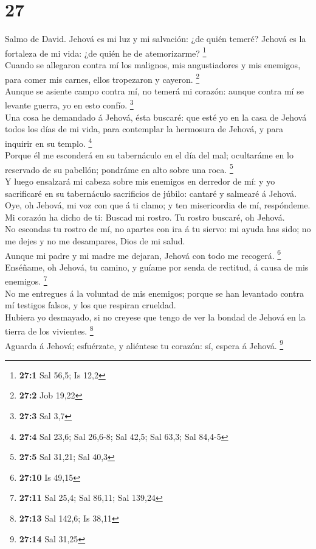 \hypertarget{section-26}{%
\section{27}\label{section-26}}

 Salmo de David. Jehová es mi luz y mi salvación: ¿de quién
temeré? Jehová es la fortaleza de mi vida: ¿de quién he de atemorizarme?
\footnote{\textbf{27:1} Sal 56,5; Is 12,2}\\
 Cuando se allegaron contra mí los malignos, mis
angustiadores y mis enemigos, para comer mis carnes, ellos tropezaron y
cayeron. \footnote{\textbf{27:2} Job 19,22}\\
 Aunque se asiente campo contra mí, no temerá mi corazón:
aunque contra mí se levante guerra, yo en esto confío. \footnote{\textbf{27:3}
  Sal 3,7}\\
 Una cosa he demandado á Jehová, ésta buscaré: que esté yo
en la casa de Jehová todos los días de mi vida, para contemplar la
hermosura de Jehová, y para inquirir en su templo. \footnote{\textbf{27:4}
  Sal 23,6; Sal 26,6-8; Sal 42,5; Sal 63,3; Sal 84,4-5}\\
 Porque él me esconderá en su tabernáculo en el día del mal;
ocultaráme en lo reservado de su pabellón; pondráme en alto sobre una
roca. \footnote{\textbf{27:5} Sal 31,21; Sal 40,3}\\
 Y luego ensalzará mi cabeza sobre mis enemigos en derredor
de mí: y yo sacrificaré en su tabernáculo sacrificios de júbilo: cantaré
y salmearé á Jehová.\\
 Oye, oh Jehová, mi voz con que á ti clamo; y ten
misericordia de mí, respóndeme.\\
 Mi corazón ha dicho de ti: Buscad mi rostro. Tu rostro
buscaré, oh Jehová.\\
 No escondas tu rostro de mí, no apartes con ira á tu
siervo: mi ayuda has sido; no me dejes y no me desampares, Dios de mi
salud.\\
 Aunque mi padre y mi madre me dejaran, Jehová con todo me
recogerá. \footnote{\textbf{27:10} Is 49,15}\\
 Enséñame, oh Jehová, tu camino, y guíame por senda de
rectitud, á causa de mis enemigos. \footnote{\textbf{27:11} Sal 25,4;
  Sal 86,11; Sal 139,24}\\
 No me entregues á la voluntad de mis enemigos; porque se
han levantado contra mí testigos falsos, y los que respiran crueldad.\\
 Hubiera yo desmayado, si no creyese que tengo de ver la
bondad de Jehová en la tierra de los vivientes. \footnote{\textbf{27:13}
  Sal 142,6; Is 38,11}\\
 Aguarda á Jehová; esfuérzate, y aliéntese tu corazón: sí,
espera á Jehová. \footnote{\textbf{27:14} Sal 31,25}

